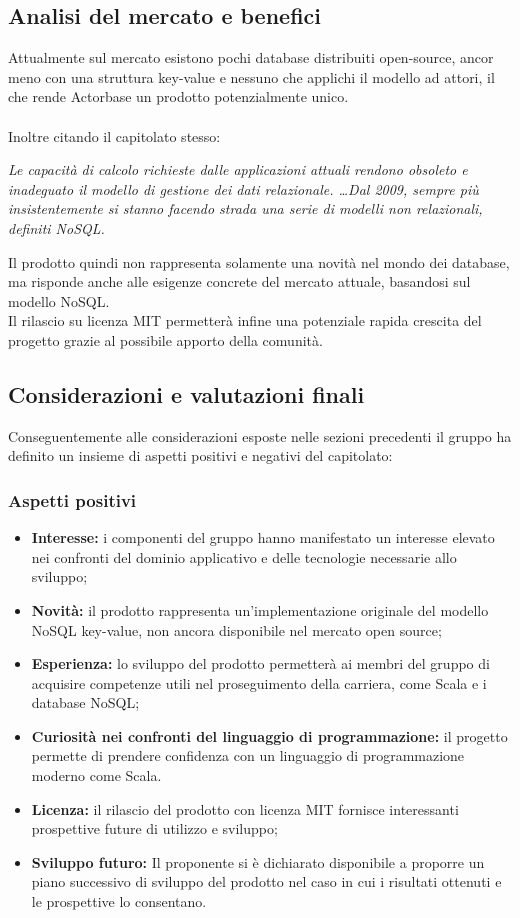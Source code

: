 \documentclass[a4paper]{article}
\begin{document}
		\subsection{Analisi del mercato e benefici}
			Attualmente sul mercato esistono pochi database distribuiti open-source, ancor meno con una
			struttura key-value e nessuno che applichi il modello ad attori, il che rende Actorbase un prodotto
			potenzialmente unico. 
			\\ \\
			Inoltre citando il capitolato stesso:
			\begin{center}
				\emph{Le capacità di calcolo richieste dalle applicazioni attuali rendono obsoleto e inadeguato
				il modello di gestione dei dati relazionale. \dots \space Dal 2009, sempre più insistentemente si
				stanno facendo strada una serie di modelli non relazionali, definiti NoSQL.}
			\end{center}
			Il prodotto quindi non rappresenta solamente una novità nel mondo dei database, ma risponde 
			anche alle esigenze concrete del mercato attuale, basandosi sul modello NoSQL.\\
			Il rilascio su licenza MIT permetterà infine una potenziale rapida crescita del progetto grazie al
			possibile apporto della comunità.
		\subsection{Considerazioni e valutazioni finali}
			Conseguentemente alle considerazioni esposte nelle sezioni precedenti il gruppo ha definito un 
			insieme di aspetti positivi e negativi del capitolato:
			\subsubsection{Aspetti positivi}
				\begin{itemize}
					\item \textbf{Interesse:} i componenti del gruppo hanno manifestato un interesse elevato 
					nei confronti del dominio applicativo e delle tecnologie necessarie allo sviluppo;
					\item \textbf{Novità:} il prodotto rappresenta un'implementazione originale del modello 
					NoSQL key-value, non ancora disponibile nel mercato open source;
					\item \textbf{Esperienza:} lo sviluppo del prodotto permetterà ai membri del gruppo di 
					acquisire competenze utili nel proseguimento della carriera, come Scala e i database NoSQL;
					\item \textbf{Curiosità nei confronti del linguaggio di programmazione:} il progetto permette 
					di prendere confidenza con un linguaggio di programmazione moderno come Scala.
					\item \textbf{Licenza:} il rilascio del prodotto con licenza MIT fornisce interessanti
					 prospettive future di utilizzo e sviluppo;
					\item \textbf{Sviluppo futuro:} Il proponente si è dichiarato disponibile a proporre un piano
					successivo di sviluppo del prodotto nel caso in cui i risultati ottenuti e le prospettive lo
					 consentano.
				\end{itemize}
\end{document}
